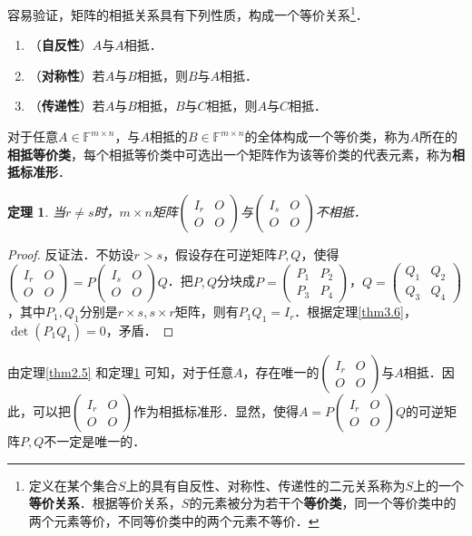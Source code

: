 \documentclass[a4paper,fontset=windows]{ctexbook}
\newtheorem{theorem}{定理}[chapter]
\theoremstyle{definition}
\begin{document}
容易验证，矩阵的相抵关系具有下列性质，构成一个等价关系\footnote{定义在某个集合$S$上的具有自反性、对称性、传递性的二元关系称为$S$上的一个{\bf 等价关系}．根据等价关系，$S$的元素被分为若干个{\bf 等价类}，同一个等价类中的两个元素等价，不同等价类中的两个元素不等价．}．
\begin{enumerate}
\item（{\bf 自反性}）$A$与$A$相抵．
\item（{\bf 对称性}）若$A$与$B$相抵，则$B$与$A$相抵．
\item（{\bf 传递性}）若$A$与$B$相抵，$B$与$C$相抵，则$A$与$C$相抵．
\end{enumerate}

对于任意$A\in\mathbb{F}^{m\times n}$，与$A$相抵的$B\in\mathbb{F}^{m\times n}$的全体构成一个等价类，称为$A$所在的{\bf 相抵等价类}，每个相抵等价类中可选出一个矩阵作为该等价类的代表元素，称为{\bf 相抵标准形}．

\begin{theorem}\label{thm4.1}
当$r\ne s$时，$m\times n$矩阵$\begin{pmatrix}I_r&O \\ O&O\end{pmatrix}$与$\begin{pmatrix}I_s&O \\ O&O\end{pmatrix}$不相抵．
\end{theorem}

\begin{proof}
反证法．不妨设$r>s$，假设存在可逆矩阵$P,Q$，使得$\begin{pmatrix}I_r&O \\ O&O\end{pmatrix}=P\begin{pmatrix}I_s&O \\ O&O\end{pmatrix}Q$．把$P,Q$分块成$P=\begin{pmatrix}P_1&P_2 \\ P_3&P_4\end{pmatrix}$，$Q=\begin{pmatrix}Q_1&Q_2 \\ Q_3&Q_4\end{pmatrix}$，其中$P_1,Q_1$分别是$r\times s,s\times r$矩阵，则有$P_1Q_1=I_r$．根据定理\ref{thm3.6}，$\det(P_1Q_1)=0$，矛盾．
\end{proof}

由定理\ref{thm2.5} 和定理\ref{thm4.1} 可知，对于任意$A$，存在唯一的$\begin{pmatrix}I_r&O \\ O&O\end{pmatrix}$与$A$相抵．因此，可以把$\begin{pmatrix}I_r&O \\ O&O\end{pmatrix}$作为相抵标准形．显然，使得$A=P\begin{pmatrix}I_r&O \\ O&O\end{pmatrix}Q$的可逆矩阵$P,Q$不一定是唯一的．
\end{document}
